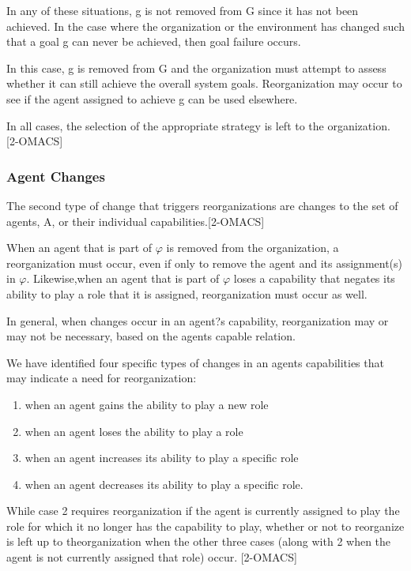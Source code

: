 In any of these situations, g is not removed from G since it has not been achieved. In the case where the organization or the environment has changed such that a goal g can never be achieved, then goal failure occurs. 

In this case, g is removed from G and the organization must attempt to assess whether it can still achieve the overall system goals. Reorganization may occur to see if the agent assigned to achieve g can be used elsewhere. 

In all cases, the selection of the appropriate strategy is left to the organization. [2-OMACS]

\subsubsection{Agent Changes }
The second type of change that triggers reorganizations are changes to the set of agents, A, or their individual capabilities.[2-OMACS]

When an agent that is part of $\varphi$ is removed from the organization, a reorganization must occur, even if only to remove the agent and its assignment(s) in $\varphi$. Likewise,when an agent that is part of $\varphi$ loses a capability that negates its ability to play a role that it is assigned, reorganization must occur as well. 

In general, when changes occur in an agent?s capability, reorganization may or may not be necessary, based on the agents capable relation. 

We have identified four specific types of changes in an agents capabilities that may indicate a need for reorganization: 

\begin{enumerate}
\item 
	when an agent gains the ability to play a new role
\item
	when an agent loses the ability to play a role
\item
	when an agent increases its ability to play a specific role
\item
	when an agent decreases its ability to play a specific role.
\end{enumerate}	
 
While case 2 requires reorganization if the agent is currently assigned to play the role for which it no longer has the capability to play, whether or not to reorganize is left up to theorganization when the other three cases (along with 2 when the agent is not currently assigned that role) occur. [2-OMACS]


